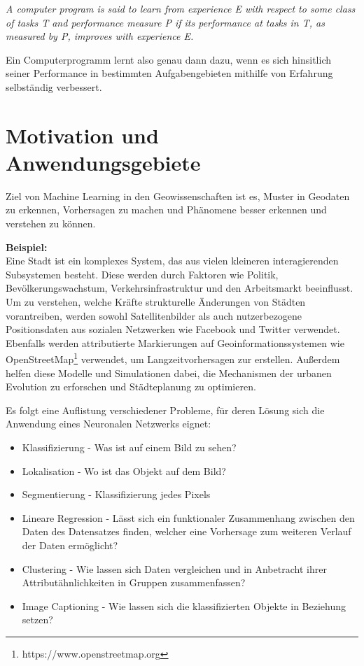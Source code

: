 \documentclass[11pt,ceqn]{book}
\begin{document}
\textit{A computer program is said to learn from experience E with
respect to some class of tasks T and performance measure P if its performance at tasks in T, as measured by P, improves with experience E.} \cite{michell}

\bigskip

Ein Computerprogramm lernt also genau dann dazu, wenn es sich hinsitlich seiner Performance in bestimmten Aufgabengebieten mithilfe von Erfahrung selbständig verbessert.

\section{Motivation und Anwendungsgebiete}
Ziel von Machine Learning in den Geowissenschaften ist es, Muster in Geodaten zu erkennen, Vorhersagen zu machen und Phänomene besser erkennen und verstehen zu können.

\bigskip
\textbf{Beispiel:}\\
Eine Stadt ist ein komplexes System, das aus vielen kleineren interagierenden Subsystemen besteht. Diese werden durch Faktoren wie Politik, Bevölkerungswachstum, Verkehrsinfrastruktur und den Arbeitsmarkt beeinflusst.
Um zu verstehen, welche Kräfte strukturelle Änderungen von Städten vorantreiben, werden sowohl Satellitenbilder als auch nutzerbezogene Positionsdaten aus sozialen Netzwerken wie Facebook und Twitter verwendet. Ebenfalls werden attributierte Markierungen auf Geoinformationssystemen wie OpenStreetMap\footnote{https://www.openstreetmap.org} verwendet, um Langzeitvorhersagen zur erstellen.
Außerdem helfen diese Modelle und Simulationen dabei, die Mechanismen der urbanen Evolution zu erforschen und Städteplanung zu optimieren.




\begin{minipage}{1\textwidth}
Es folgt eine Auflistung verschiedener Probleme, für deren Lösung sich die Anwendung eines Neuronalen Netzwerks eignet:

\begin{itemize}
\item Klassifizierung - Was ist auf einem Bild zu sehen?
\item Lokalisation - Wo ist das Objekt auf dem Bild?
\item Segmentierung - Klassifizierung jedes Pixels
\item Lineare Regression - Lässt sich ein funktionaler Zusammenhang zwischen den Daten des Datensatzes finden, welcher eine Vorhersage zum weiteren Verlauf der Daten ermöglicht?
\item Clustering - Wie lassen sich Daten vergleichen und in Anbetracht ihrer Attributähnlichkeiten in Gruppen zusammenfassen?
\item Image Captioning - Wie lassen sich die klassifizierten Objekte in Beziehung setzen? 
\end{itemize}
\end{minipage}
\end{document}
